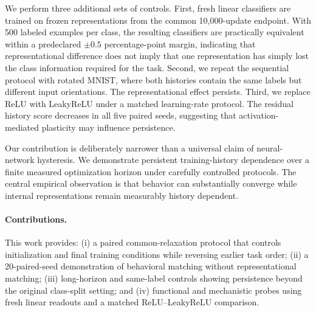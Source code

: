 \documentclass[11pt,a4paper]{article}
\begin{document}
We perform three additional sets of controls. First, fresh linear classifiers are trained on frozen representations from the common 10,000-update endpoint. With 500 labeled examples per class, the resulting classifiers are practically equivalent within a predeclared $\pm0.5$ percentage-point margin, indicating that representational difference does not imply that one representation has simply lost the class information required for the task. Second, we repeat the sequential protocol with rotated MNIST, where both histories contain the same labels but different input orientations. The representational effect persists. Third, we replace ReLU with LeakyReLU under a matched learning-rate protocol. The residual history score decreases in all five paired seeds, suggesting that activation-mediated plasticity may influence persistence.

Our contribution is deliberately narrower than a universal claim of neural-network hysteresis. We demonstrate persistent training-history dependence over a finite measured optimization horizon under carefully controlled protocols. The central empirical observation is that behavior can substantially converge while internal representations remain measurably history dependent.

\paragraph{Contributions.} This work provides: (i) a paired common-relaxation protocol that controls initialization and final training conditions while reversing earlier task order; (ii) a 20-paired-seed demonstration of behavioral matching without representational matching; (iii) long-horizon and same-label controls showing persistence beyond the original class-split setting; and (iv) functional and mechanistic probes using fresh linear readouts and a matched ReLU--LeakyReLU comparison.
\end{document}
